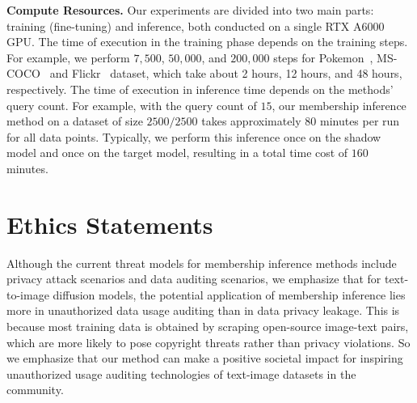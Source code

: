 \documentclass{article}
\theoremstyle{plain}
\theoremstyle{remark}
\begin{document}
\textbf{Compute Resources.} 
Our experiments are divided into two main parts: training (fine-tuning) and inference, both conducted on a single RTX A6000 GPU. The time of execution in the training phase depends on the training steps. For example, we perform $7,500$, $50,000$, and $200,000$ steps for Pokemon~\cite{Pokemon-Blip}, MS-COCO~\cite{lin2014microsoft} and Flickr~\cite{young2014image} dataset, which take about 2 hours, 12 hours, and 48 hours, respectively.
The time of execution in inference time depends on the methods' query count. For example, with the query count of $15$,  our membership inference method on a dataset of size $2500/2500$ takes approximately $80$ minutes per run for all data points. Typically, we perform this inference once on the shadow model and once on the target model, resulting in a total time cost of $160$ minutes. 





\section{Ethics Statements}\label{appd:ethics}
Although the current threat models for membership inference methods include privacy attack scenarios and data auditing scenarios, we emphasize that for text-to-image diffusion models, the potential application of membership inference lies more in unauthorized data usage auditing than in data privacy leakage. This is because most training data is obtained by scraping open-source image-text pairs, which are more likely to pose copyright threats rather than privacy violations. So we emphasize that our method can make a positive societal impact for inspiring unauthorized usage auditing technologies of text-image datasets in the community.




\end{document}
